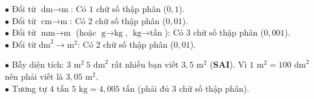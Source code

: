 \documentclass[14pt,a4paper,oneside]{extbook}
\begin{document}
\vspace{3mm}

\noindent
\begin{minipage}[t]{0.54\textwidth}
  \begin{tcolorbox}[
    enhanced,
    title={\footnotesize\bfseries\color{white}\faBolt\ Quy tắc số lượng chữ số thập phân},
    colback=green!3!white,
    colframe=green!60!black,
    arc=2.5mm, boxrule=0.8pt, top=1.8mm, bottom=1.8mm, left=2.2mm, right=2.2mm
  ]
    \footnotesize
    $\bullet$ Đổi từ $\text{dm} \rightarrow \text{m}$: Có $1$ chữ số thập phân ($0,1$).\\
    $\bullet$ Đổi từ $\text{cm} \rightarrow \text{m}$: Có $2$ chữ số thập phân ($0,01$).\\
    $\bullet$ Đổi từ $\text{mm} \rightarrow \text{m}$ (hoặc $\text{g} \rightarrow \text{kg}$, $\text{kg} \rightarrow \text{tấn}$): Có $3$ chữ số thập phân ($0,001$).\\
    $\bullet$ Đổi từ $\text{dm}^2 \rightarrow \text{m}^2$: Có $2$ chữ số thập phân ($0,01$).
  \end{tcolorbox}
\end{minipage}%
\hfill
\begin{minipage}[t]{0.44\textwidth}
  \begin{tcolorbox}[
    enhanced,
    title={\footnotesize\bfseries\color{white}\faExclamationTriangle\ Mẹo tránh bẫy trắc nghiệm},
    colback=red!2!white,
    colframe=red!70!black,
    arc=2.5mm, boxrule=0.8pt, top=1.8mm, bottom=1.8mm, left=2.2mm, right=2.2mm
  ]
    \footnotesize
    $\bullet$ Bẫy diện tích: $3\text{ m}^2\ 5\text{ dm}^2$ rất nhiều bạn viết $3,5\text{ m}^2$ (\textbf{SAI}). Vì $1\text{ m}^2 = 100\text{ dm}^2$ nên phải viết là $3,05\text{ m}^2$.\\
    $\bullet$ Tương tự $4\text{ tấn } 5\text{ kg} = 4,005\text{ tấn}$ (phải đủ $3$ chữ số thập phân).
  \end{tcolorbox}
\end{minipage}
\end{document}
